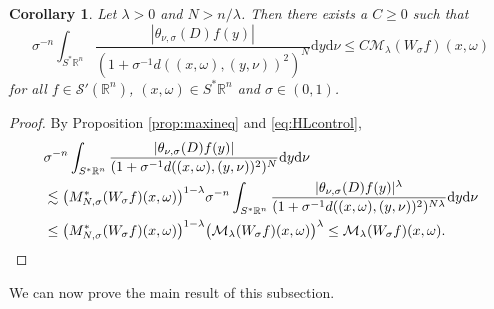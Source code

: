 \documentclass{amsart}
\newcommand {\C}{{\mathbb C}}
\newcommand {\ud}{\mathrm{d}}
\newcommand {\la}{\lambda}
\newcommand {\Ma}{\mathcal{M}}
\newcommand {\Rn}{\mathbb{R}^{n}}
\newcommand {\Sp}{S^{*}\Rn}
\newcommand {\Sw}{\mathcal{S}}
\newcommand {\w}{\omega}
\newtheorem{corollary}[theorem]{Corollary}
\theoremstyle{definition}
\newtheorem{remark}[theorem]{Remark}
\numberwithin{equation}{section}
\begin{document}
\begin{corollary}\label{cor:maxineq}
Let $\lambda>0$ and $N>n/\la$. Then there exists a $C\geq0$ such that
\[
\sigma^{-n}\int_{\Sp}\frac{|\theta_{\nu,{\sigma}}(D)f(y)|}{(1+{\sigma}^{-1}d((x,\omega),(y,\nu))^{2})^{N}}\ud y\ud\nu
\leq C\Ma_{\lambda}(W_{\sigma}f)(x,\omega)
\]
for all $f\in \Sw'(\Rn)$, $(x,\w)\in\Sp$ and $\sigma\in(0,1)$.
\end{corollary}
\begin{proof}
By Proposition \ref{prop:maxineq} and \eqref{eq:HLcontrol}, 
\begin{align*}
&\sigma^{-n}\int_{\Sp}\frac{|\theta_{\nu,{\sigma}}(D)f(y)|}{(1+\sigma^{-1}d((x,\omega),(y,\nu))^{2})^{N}}\ud y\ud\nu\\
&\lesssim \big(M_{N,\sigma}^{*}(W_{\sigma}f)(x,\omega)\big)^{1-\lambda}\sigma^{-n}\int_{\Sp}\frac{|\theta_{\nu,{\sigma}}(D)f(y)|^{\lambda}}{(1+\sigma^{-1}d((x,\omega),(y,\nu))^{2})^{N\lambda}}\ud y\ud\nu\\
&\leq \big(M_{N,\sigma}^{*}(W_{\sigma}f)(x,\omega)\big)^{1-\lambda}\big(\Ma_{\lambda}(W_{\sigma}f)(x,\omega)\big)^{\lambda}\leq \Ma_{\lambda}(W_{\sigma}f)(x,\omega).\qedhere
\end{align*}
\end{proof}


We can now prove the main result of this subsection.
\end{document}
